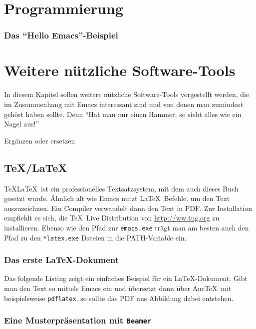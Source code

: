 \documentclass[12pt,ngerman]{scrbook}
\begin{document}
\chapter{Programmierung}

\subsection{Das \enquote{Hello Emacs}-Beispiel}




\chapter{Weitere nützliche Software-Tools}

In diesem Kapitel sollen weitere nützliche Software-Tools vorgestellt werden, die im Zusammenhang mit Emacs interessant sind und von denen man zumindest gehört haben sollte. Denn \enquote{Hat man nur einen Hammer, so sieht alles wie ein Nagel aus!}	

Ergänzen oder ersetzen

\section{\TeX/\LaTeX}

\TeX\LaTeX\ ist ein professionelles Textsatzsystem, mit dem auch dieses Buch gesetzt wurde. Ähnlich alt wie Emacs nutzt \LaTeX\ Befehle, um den Text auszuzeichnen. Ein Compiler verwandelt dann den Text in PDF. Zur Installation empfiehlt es sich, die \TeX\ Live Distribution von \url{http://ww.tug.org} zu installieren. Ebenso wie den Pfad zur \texttt{emacs.exe} trägt man am besten auch den Pfad zu den \texttt{*latex.exe} Dateien in die PATH-Variable ein.

\subsection{Das erste \LaTeX-Dokument}

Das folgende Listing zeigt ein einfaches Beispiel für ein \LaTeX-Dokument. Gibt man den Text so mittels Emacs ein und übersetzt dann über Auc\TeX\ mit beispielsweise \texttt{pdflatex}, so sollte das PDF aus Abbildung  dabei entstehen. 


\subsection{Eine Musterpräsentation mit \texttt{Beamer}}
\end{document}
